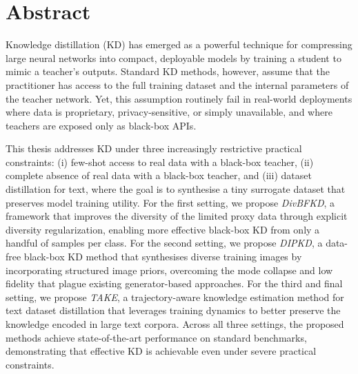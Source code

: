 \chapter*{Abstract}

\begin{foldable}
  Knowledge distillation (KD) has emerged as a powerful technique for compressing large neural networks into compact, deployable models by training a student to mimic a teacher's outputs.
  Standard KD methods, however, assume that the practitioner has access to the full training dataset and the internal parameters of the teacher network.
  Yet, this assumption routinely fail in real-world deployments where data is proprietary, privacy-sensitive, or simply unavailable, and where teachers are exposed only as black-box APIs.
\end{foldable}

\begin{foldable}
  This thesis addresses KD under three increasingly restrictive practical constraints: (i) few-shot access to real data with a black-box teacher, (ii) complete absence of real data with a black-box teacher, and (iii) dataset distillation for text, where the goal is to synthesise a tiny surrogate dataset that preserves model training utility.
  For the first setting, we propose \emph{DivBFKD}, a framework that improves the diversity of the limited proxy data through explicit diversity regularization, enabling more effective black-box \ac{KD} from only a handful of samples per class.
  For the second setting, we propose \emph{DIPKD}, a data-free black-box \ac{KD} method that synthesises diverse training images by incorporating structured image priors, overcoming the mode collapse and low fidelity that plague existing generator-based approaches.
  For the third and final setting, we propose \emph{TAKE}, a trajectory-aware knowledge estimation method for text dataset distillation that leverages training dynamics to better preserve the knowledge encoded in large text corpora.
  Across all three settings, the proposed methods achieve state-of-the-art performance on standard benchmarks, demonstrating that effective KD is achievable even under severe practical constraints.
\end{foldable}
